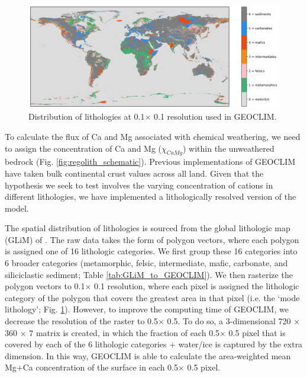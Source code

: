 \documentclass[11pt,letterpaper]{article}
\newcommand{\degrees}{\textdegree\xspace}
\begin{document}
\begin{figure}[h!]
    \centering
    \includegraphics[width=1\textwidth]{Manuscript/Figures/world_lithology.jpg}
    \caption{Distribution of lithologies at 0.1\degrees $\times$ 0.1\degrees resolution used in GEOCLIM.}
    \label{fig:world_lithology}
\end{figure}

To calculate the flux of Ca and Mg associated with chemical weathering, we need to assign the concentration of Ca and Mg ($\chi_{CaMg}$) within the unweathered bedrock (Fig. \ref{fig:regolith_schematic}). Previous implementations of GEOCLIM have taken bulk continental crust values across all land. Given that the hypothesis we seek to test involves the varying concentration of cations in different lithologies, we have implemented a lithologically resolved version of the model.

The spatial distribution of lithologies is sourced from the global lithologic map (GLiM) of \citet{Hartmann2012a}. The raw data takes the form of polygon vectors, where each polygon is assigned one of 16 lithologic categories. We first group these 16 categories into 6 broader categories (metamorphic, felsic, intermediate, mafic, carbonate, and siliciclastic sediment; Table \ref{tab:GLiM_to_GEOCLIM}). We then rasterize the polygon vectors to 0.1\degrees $\times$ 0.1\degrees resolution, where each pixel is assigned the lithologic category of the polygon that covers the greatest area in that pixel (i.e. the `mode lithology'; Fig. \ref{fig:world_lithology}). However, to improve the computing time of GEOCLIM, we decrease the resolution of the raster to 0.5\degrees $\times$ 0.5\degrees. To do so, a 3-dimensional 720 $\times$ 360 $\times$ 7 matrix is created, in which the fraction of each 0.5\degrees $\times$ 0.5\degrees pixel that is covered by each of the 6 lithologic categories + water/ice is captured by the extra dimension. In this way, GEOCLIM is able to calculate the area-weighted mean Mg+Ca concentration of the surface in each 0.5\degrees $\times$ 0.5\degrees pixel.
\end{document}
